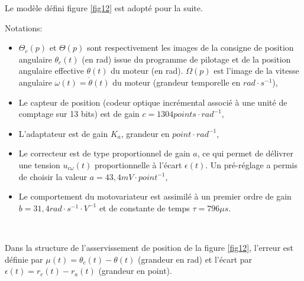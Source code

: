 Le modèle défini figure \ref{fig12} est adopté pour la suite.


\newpage

Notations:
\begin{itemize}
 \item $\Theta_c(p)$ et $\Theta(p)$ sont respectivement les images de la consigne de position angulaire $\theta_c(t)$ (en rad) issue du
programme de pilotage et de la position angulaire effective $\theta(t)$ du moteur (en rad). $\Omega(p)$ est l’image de la vitesse angulaire $\omega(t)=\dot{\theta}(t)$ du moteur (grandeur temporelle en $rad\cdot s^{-1}$),
 \item Le capteur de position (codeur optique incrémental associé à une unité de comptage sur 13 bits) est de gain $c=1304 points\cdot rad^{-1}$,
 \item L’adaptateur est de gain $K_a$, grandeur en $point\cdot rad^{-1}$,
 \item Le correcteur est de type proportionnel de gain $a$, ce qui permet de délivrer une tension $u_{c\omega}(t)$ proportionnelle
à l’écart $\epsilon(t)$. Un pré-réglage a permis de choisir la valeur $a=43,4mV\cdot point^{-1}$,
 \item Le comportement du motovariateur est assimilé à un premier ordre de gain $b=31,4rad\cdot s^{-1}\cdot V^{-1}$ et de constante de temps $\tau=796\mu s$.
\end{itemize}


~\

Dans la structure de l’asservissement de position de la figure \ref{fig12}, l’erreur est définie par $\mu(t)=\theta_c(t)-\theta(t)$ (grandeur en rad) et l’écart par $\epsilon(t)=r_c(t)-r_a(t)$ (grandeur en point).




